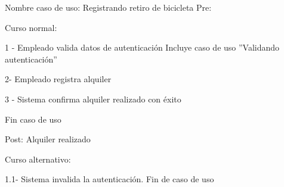 Nombre caso de uso: Registrando retiro de bicicleta
Pre: 

Curso normal: 

1 - Empleado valida datos de autenticación
	  Incluye caso de uso ''Validando autenticación''

2- Empleado registra alquiler

3 - Sistema confirma alquiler realizado con éxito

Fin caso de uso

Post: Alquiler realizado

Curso alternativo:

1.1- Sistema invalida la autenticación. Fin de caso de uso

~

~

